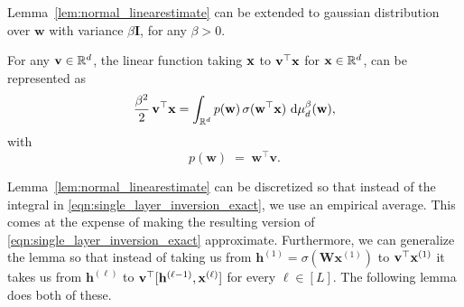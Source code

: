Lemma~\ref{lem:normal_linearestimate} can be extended to gaussian distribution over $\mathbf{w}$ with variance $\beta \mathbf{I}$, for any $\beta > 0$.
\begin{corollary}\label{cor:linear_estimate}
	For any $\mathbf{v} \in \mathbb{R}^d$, the linear function taking $\mathbf{x}$ to $\mathbf{v}^\top \mathbf{x}$ for $\mathbf{x} \in \mathbb{R}^d$, can be represented as
	\begin{equation}\label{eqn:single_layer_inversion_exact_cor}
		\frac{\beta^2}{2} \, \mathbf{v}^\top \mathbf{x} = \int_{\mathbb{R}^d} p(\mathbf{w}) \, \sigma(\mathbf{w}^{\top} \mathbf{x} ) \,\,\mathrm{d} \mu_d^{\beta} (\mathbf{w}),
	\end{equation}
	with 
	$$p\left(\mathbf{w}\right) \;=\;   \mathbf{w}^{\top} \mathbf{v}.$$ 
\end{corollary}


Lemma~\ref{lem:normal_linearestimate} can be discretized so that instead of the integral in \eqref{eqn:single_layer_inversion_exact}, we use an empirical average.
This comes at the expense of making the resulting version of \eqref{eqn:single_layer_inversion_exact} approximate. Furthermore, we can generalize the lemma so that instead of taking us from $\mathbf{h}^{(1)} = \sigma(\mathbf{W}\mathbf{x}^{(1)})$ to $\mathbf{v}^\top \mathbf{x}^{(1)}$ it takes us from $\mathbf{h}^{(\ell)}$ to  $\mathbf{v}^\top [\mathbf{h}^{(\ell-1)}, \mathbf{x}^{(\ell)}]$ for every $\ell \in [L]$. The following lemma does both of these.






